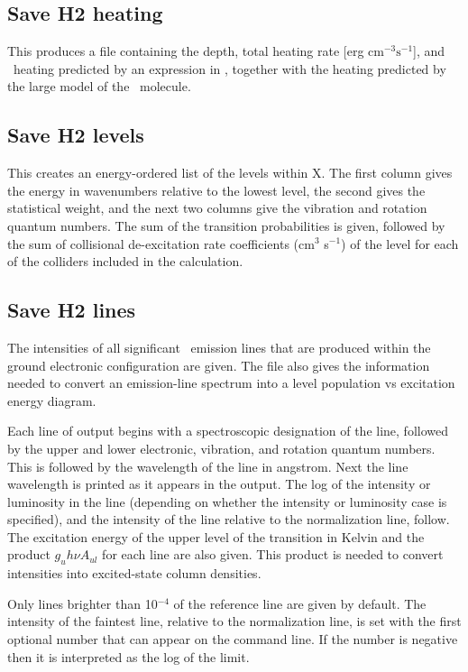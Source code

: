 \subsection{Save H2 heating}

This produces a file containing the depth, total heating rate [erg
cm$^{-3}\mathrm{s}^{-1}$], and \htwo\ heating predicted by an expression in \citet{Tielens1985a}, together with the heating predicted by the large model of the \htwo\ molecule.

\subsection{Save H2 levels}

This creates an energy-ordered list of the levels within X.  The first
column gives the energy in wavenumbers relative to the lowest level, the
second gives the statistical weight, and the next two columns give the
vibration and rotation quantum numbers.  The sum of the transition
probabilities is given, followed by the sum of collisional de-excitation rate
coefficients (cm$^{3}$ s$^{-1}$) of the level for each of the colliders 
included in the calculation.

\subsection{Save H2 lines}

The intensities of all significant \htwo\ emission lines that are produced
within the ground electronic configuration are given.  The file also gives the
information needed to convert an emission-line spectrum into a level
population vs excitation energy diagram.

Each line of output begins with a spectroscopic designation of the line,
followed by the upper and lower electronic, vibration, and rotation quantum
numbers.
This is followed by the wavelength of the line in angstrom.
Next the
line wavelength is printed as it appears in the output.
The log of
the intensity or luminosity in the line (depending on whether the intensity
or luminosity case is specified), and the intensity of the line relative
to the normalization line, follow.
The excitation energy of the upper
level of the transition in Kelvin and the product
$g_u h\nu A_{ul} $  for each line are also given.
This product is needed to convert
intensities into excited-state column densities.

Only lines brighter than 10$^{-4}$ of the reference line are given by default.
The intensity of the faintest line, relative to the normalization line,
is set with the first optional number that can appear on the command line.
If the number is negative then it is interpreted as the log of the limit.

